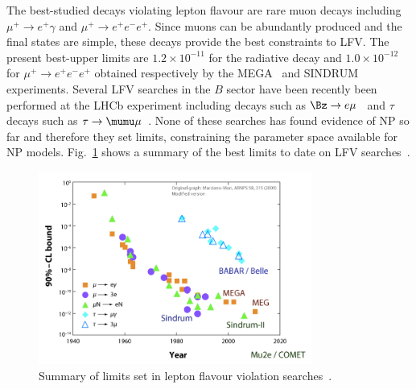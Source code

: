 The best-studied decays violating lepton flavour 
are rare muon decays including $\mu^+\to e^+\gamma$ and $\mu^+\to e^+e^-e^+$.
Since muons can be abundantly produced and the final states are simple,
these decays provide the best constraints to LFV. The present best-upper limits are $1.2 \times 10^{-11}$
for the radiative decay and $1.0 \times 10^{-12}$ for $\mu^+\to e^+e^-e^+$ obtained
respectively by the MEGA~\cite{Ahmed:2001eh} and SINDRUM~\cite{Bellgardt:1987du} experiments.
Several LFV searches in the $B$ sector have been recently been performed at the LHCb experiment 
including decays such as $\Bz\to e\mu$~\cite{LHCB-PAPER-2013-030} and $\tau$ decays such
as $\tau\to\mumu\mu$~\cite{LHCB-PAPER-2013-014}. None of these searches has found evidence 
of NP so far and therefore they set limits, constraining the parameter space available for NP models.
Fig.~\ref{fig:LFV_decay} shows a summary of the best limits to date on LFV searches~\cite{Marciano:2008zz}.


\begin{figure}[h!]
\centering 
\includegraphics[width=0.8\textwidth]{Introduction/figs/LFV.png}
\caption{Summary of limits set in lepton flavour violation searches~\cite{Marciano:2008zz}.}
\label{fig:LFV_decay}
\end{figure}
 